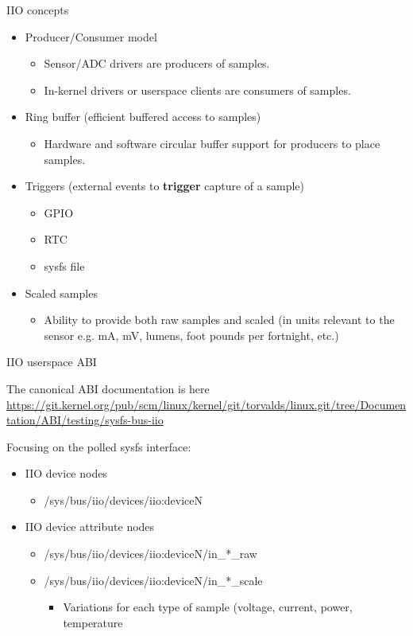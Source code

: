\begin{frame}
	{IIO concepts}
   \begin{itemize}
	   	\item Producer/Consumer model
		   \begin{itemize}
			   \item Sensor/ADC drivers are producers of samples.
			   \item In-kernel drivers or userspace clients are consumers of samples.
		   \end{itemize}
		\item Ring buffer (efficient buffered access to samples)
		   \begin{itemize}
			   \item Hardware and software circular buffer support for producers to place samples.
		   \end{itemize}
      		\item Triggers (external events to \textbf{trigger} capture of a sample)
		   \begin{itemize}
			   \item GPIO
			   \item RTC
			   \item sysfs file
		   \end{itemize}
      		\item Scaled samples
		   \begin{itemize}
			   \item Ability to provide both raw samples and scaled (in units relevant to the sensor e.g. mA, mV, lumens, foot pounds per fortnight, etc.)
    		   \end{itemize}
   \end{itemize}
\end{frame}

\begin{frame}
	{IIO userspace ABI}

	The canonical ABI documentation is here \url{https://git.kernel.org/pub/scm/linux/kernel/git/torvalds/linux.git/tree/Documentation/ABI/testing/sysfs-bus-iio}

	Focusing on the polled sysfs interface:
	\begin{itemize}
		\item IIO device nodes
			\begin{itemize}
				\item /sys/bus/iio/devices/iio:deviceN
			\end{itemize}
		\item IIO device attribute nodes
			\begin{itemize}
				\item /sys/bus/iio/devices/iio:deviceN/in\_*\_raw
				\item /sys/bus/iio/devices/iio:deviceN/in\_*\_scale
				\begin{itemize}
					\item Variations for each type of sample (voltage, current, power, temperature
				\end{itemize}
			\end{itemize}
	\end{itemize}
\end{frame}

